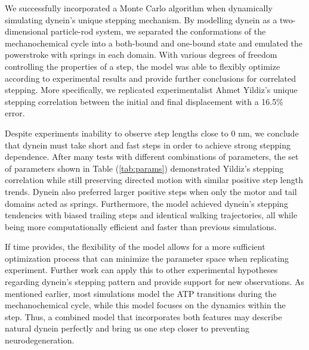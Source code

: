 

We successfully incorporated a Monte Carlo algorithm when dynamically simulating dynein's unique stepping mechanism. By modelling dynein as a two-dimensional particle-rod system, we separated the conformations of the mechanochemical cycle into a both-bound and one-bound state and emulated the powerstroke with springs in each domain. With various degrees of freedom controlling the properties of a step, the model was able to flexibly optimize according to experimental results and provide further conclusions for correlated stepping. More specifically, we replicated experimentalist Ahmet Yildiz's unique stepping correlation between the initial and final displacement with a 16.5\% error.

Despite experiments inability to observe step lengths close to 0 nm, we conclude that dynein must take short and fast steps in order to achieve strong stepping dependence. After many tests with different combinations of parameters, the set of parameters shown in Table (\ref{tab:params}) demonstrated Yildiz's stepping correlation while still preserving directed motion with similar positive step length trends. Dynein also preferred larger positive steps when only the motor and tail domains acted as springs. Furthermore, the model achieved dynein's stepping tendencies with biased trailing steps and identical walking trajectories, all while being more computationally efficient and faster than previous simulations. 

If time provides, the flexibility of the model allows for a more sufficient optimization process that can minimize the parameter space when replicating experiment. Further work can apply this to other experimental hypotheses regarding dynein's stepping pattern and provide support for new observations. As mentioned earlier, most simulations model the ATP transitions during the mechanochemical cycle, while this model focuses on the dynamics within the step. Thus, a combined model that incorporates both features may describe natural dynein perfectly and bring us one step closer to preventing neurodegeneration. 

